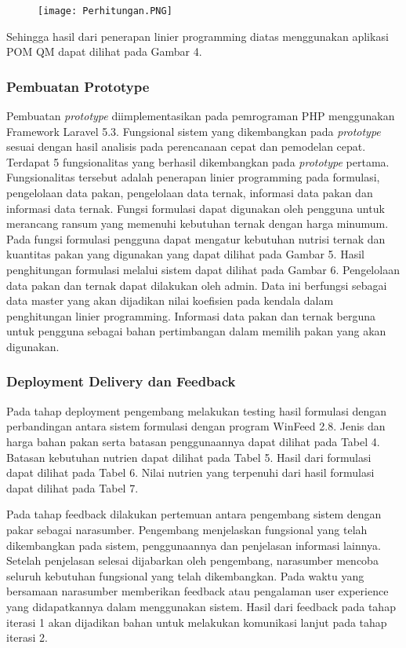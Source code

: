 \begin{figure}[h!] %
	\texttt{[image: Perhitungan.PNG]}
\end{figure}

Sehingga hasil dari penerapan linier programming diatas menggunakan aplikasi POM QM dapat dilihat pada Gambar 4.

\subsubsection*{Pembuatan Prototype}
Pembuatan \textit{prototype }diimplementasikan pada pemrograman PHP menggunakan Framework Laravel 5.3. Fungsional sistem yang dikembangkan pada \textit{prototype }sesuai dengan hasil analisis pada perencanaan cepat dan pemodelan cepat. Terdapat 5 fungsionalitas yang berhasil dikembangkan pada \textit{prototype }pertama. Fungsionalitas tersebut adalah penerapan linier programming pada formulasi, pengelolaan data pakan, pengelolaan data ternak, informasi data pakan dan informasi data ternak. Fungsi formulasi dapat digunakan oleh pengguna untuk merancang ransum yang memenuhi kebutuhan ternak dengan harga minumum. Pada fungsi formulasi pengguna dapat mengatur kebutuhan nutrisi ternak dan kuantitas pakan yang digunakan yang dapat dilihat pada Gambar 5. Hasil penghitungan formulasi melalui sistem dapat dilihat pada Gambar 6. Pengelolaan data pakan dan ternak dapat dilakukan oleh admin. Data ini berfungsi sebagai data master yang akan dijadikan nilai koefisien pada kendala dalam penghitungan linier programming. Informasi data pakan dan ternak berguna untuk pengguna sebagai bahan pertimbangan dalam memilih pakan yang akan digunakan.

\subsubsection*{Deployment Delivery dan Feedback}
Pada tahap deployment pengembang melakukan testing hasil formulasi dengan perbandingan antara sistem formulasi dengan program WinFeed 2.8. Jenis dan harga bahan pakan serta batasan penggunaannya dapat dilihat pada Tabel 4. Batasan kebutuhan nutrien dapat dilihat pada Tabel 5. Hasil dari formulasi dapat dilihat pada Tabel 6. Nilai nutrien yang terpenuhi dari hasil formulasi dapat dilihat pada Tabel 7.

Pada tahap feedback dilakukan pertemuan antara pengembang sistem dengan pakar sebagai narasumber. Pengembang menjelaskan fungsional yang telah dikembangkan pada sistem, penggunaannya dan penjelasan informasi lainnya. Setelah penjelasan selesai dijabarkan oleh pengembang, narasumber mencoba seluruh kebutuhan fungsional yang telah dikembangkan. Pada waktu yang bersamaan narasumber memberikan feedback atau pengalaman user experience yang didapatkannya dalam menggunakan sistem. Hasil dari feedback pada tahap iterasi 1 akan dijadikan bahan untuk melakukan komunikasi lanjut pada tahap iterasi 2.


